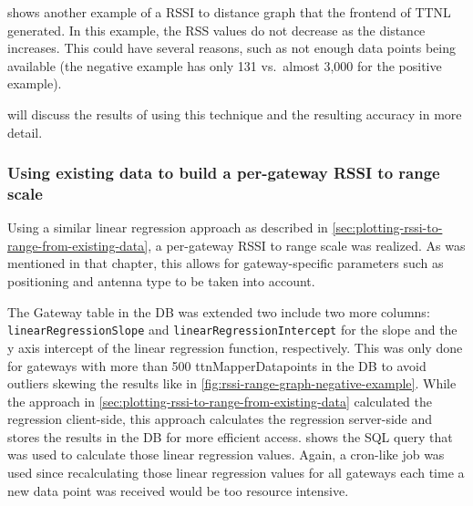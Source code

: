  shows another example of a \ac{RSSI} to distance graph that the frontend of \ac{TTNL} generated.
In this example, the \ac{RSS} values do not decrease as the distance increases.
This could have several reasons, such as not enough data points being available (the negative example has only 131 vs.\ almost 3,000 for the positive example).

 will discuss the results of using this technique and the resulting accuracy in more detail.

\subsubsection{Using existing data to build a per-gateway \acs{RSSI} to range scale}\label{subsubsec:per-gateway-rssi-to-range-scale}

Using a similar linear regression approach as described in \cref{sec:plotting-rssi-to-range-from-existing-data}, a per-gateway \ac{RSSI} to range scale was realized.
As was mentioned in that chapter, this allows for gateway-specific parameters such as positioning and antenna type to be taken into account.

The Gateway table in the \ac{DB} was extended two include two more columns: \texttt{linear\-Regres\-sion\-Slope} and \texttt{linear\-Re\-gres\-sion\-Inter\-cept} for the slope and the y axis intercept of the linear regression function, respectively.
This was only done for gateways with more than 500 ttnMapperDatapoints in the \ac{DB} to avoid outliers skewing the results like in \cref{fig:rssi-range-graph-negative-example}.
While the approach in \cref{sec:plotting-rssi-to-range-from-existing-data} calculated the regression client-side, this approach calculates the regression server-side and stores the results in the \ac{DB} for more efficient access.
 shows the \ac{SQL} query that was used to calculate those linear regression values.
Again, a cron-like job was used since recalculating those linear regression values for all gateways each time a new data point was received would be too resource intensive.

